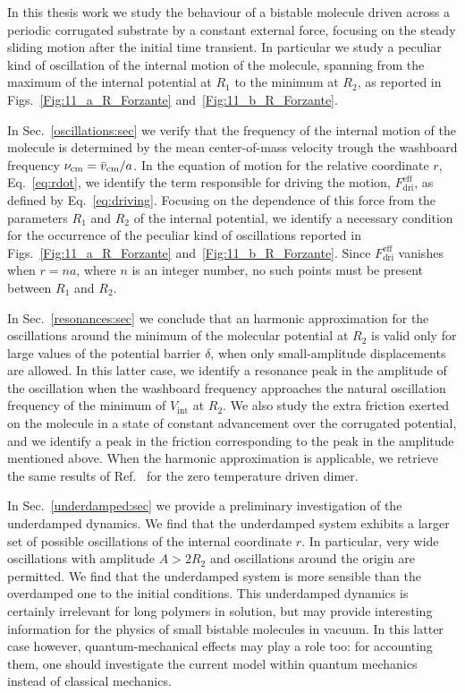 In this thesis work we study the behaviour of a bistable molecule driven across a periodic corrugated substrate by a constant external force, focusing on the steady sliding motion after the initial time transient. In particular we study a peculiar kind of oscillation of the internal motion of the molecule, spanning from the maximum of the internal potential at $R_1$ to the minimum at $R_2$, as reported in Figs.~\ref{Fig:11_a_R_Forzante} and~\ref{Fig:11_b_R_Forzante}.

In Sec.~\ref{oscillations:sec} we verify that the frequency of the internal motion of the molecule is determined by the mean center-of-mass velocity trough the washboard frequency $\nu_\text{cm} = \Bar{v}_\text{cm}/a$. In the equation of motion for the relative coordinate $r$, Eq.~\eqref{eq:rdot}, we identify the term responsible for driving the motion, $F_\text{dri}^\text{eff}$, as defined by Eq.~\eqref{eq:driving}. Focusing on the dependence of this force from the parameters $R_1$ and $R_2$ of the internal potential, we identify a necessary condition for the occurrence of the peculiar kind of oscillations reported in Figs.~\ref{Fig:11_a_R_Forzante} and~\ref{Fig:11_b_R_Forzante}. Since $F_\text{dri}^\text{eff}$ vanishes when $r = na$, where $n$ is an integer number, no such points must be present between $R_1$ and $R_2$. 

In Sec.~\ref{resonances:sec} we conclude that an harmonic approximation for the oscillations around the minimum of the molecular potential at $R_2$ is valid only for large values of the potential barrier $\delta$, when only small-amplitude displacements are allowed. In this latter case, we identify a resonance peak in the amplitude of the oscillation when the washboard frequency approaches the natural oscillation frequency of the minimum of $V_\text{int}$ at $R_2$. We also study the extra friction exerted on the molecule in a state of constant advancement over the corrugated potential, and we identify a peak in the friction corresponding to the peak in the amplitude mentioned above. When the harmonic approximation is applicable, we retrieve the same results of Ref.~\cite{Fusco} for the zero temperature driven dimer. 

In Sec.~\ref{underdamped:sec} we provide a preliminary investigation of the underdamped dynamics. We find that the underdamped system exhibits a larger set of possible oscillations of the internal coordinate $r$. In particular, very wide oscillations with amplitude $A>2R_2$ and oscillations around the origin are permitted. We find that the underdamped system is more sensible than the overdamped one to the initial conditions. This underdamped dynamics is certainly irrelevant for long polymers in solution, but may provide interesting information for the physics of small bistable molecules in vacuum. In this latter case however, quantum-mechanical effects may play a role too: for accounting them, one should investigate the current model within quantum mechanics instead of classical mechanics.


